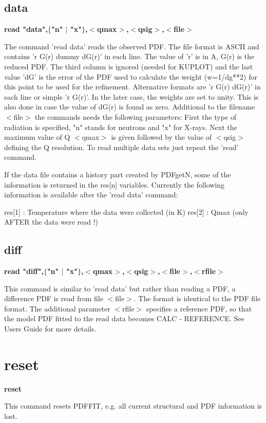 \subsection*{data}
{\bf read "data",$ \{$"n" $| $ "x"$\} $,$ <$qmax$> $,$ <$qsig$> $,$ <$file$> $ \par }
\par
\vspace{3pt}
The command 'read data' reads the observed PDF. The file 
format is ASCII and contains 'r G(r) dummy dG(r)' in each line. 
The value of 'r' is in A, G(r) is the reduced PDF. The 
third column is ignored (needed for KUPLOT) and the last 
value 'dG' is the error of the PDF used to calculate the 
weight (w=1/dg**2) for this point to be used for the 
refinement. Alternative formats are 'r G(r) dG(r)' in each 
line or simple 'r G(r)'. In the later case, the weights are 
set to unity. This is also done in case the value of dG(r) 
is found as zero. Additional to the filename $ <$file$> $ the commands 
needs the following parameters: First the type of radiation 
is specified, "n" stands for neutrons and "x" for X-rays. 
Next the maximum value of Q $ <$qmax$> $ is given followed by the 
value of $ <$qsig$> $ defining the Q resolution. To read multiple 
data sets just repeat the 'read' command. 
\par
If the data file contains a history part created by PDFgetN, 
some of the information is returned in the res[n] variables. 
Currently the following information is available after the 
'read data' command: 
\par
\begin{MacVerbatim}
res[1]   : Temperature where the data were collected (in K)
res[2]   : Qmax (only AFTER the data were read !)
\end{MacVerbatim}
\subsection*{diff}
{\bf read "diff",$ \{$"n" $| $ "x"$\} $,$ <$qmax$> $,$ <$qsig$> $,$ <$file$> $,$ <$rfile$> $ \par }
\par
\vspace{3pt}
This command is similar to 'read data' but rather than reading 
a PDF, a difference PDF is read from file $ <$file$> $. The format 
is identical to the PDF file format. The additional parameter 
$ <$rfile$> $ specifies a reference PDF, so that the model PDF fitted 
to the read data becomes CALC - REFERENCE. See Users Guide for 
more details. 
\section{reset}
{\bf reset \par }
\par
\vspace{3pt}
This command resets PDFFIT, e.g. all current structural and 
PDF information is lost. 
